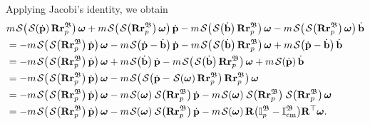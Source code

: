 Applying Jacobi's identity, we obtain
\begin{align}
    &m\SL[\SL[\dot{\mathbf{p}}]\mathbf{R}\mathbf{r}_p^\mathfrak{B}]\boldsymbol{\omega} + m\SL[\SL[\mathbf{R}\mathbf{r}_p^\mathfrak{B}]\boldsymbol{\omega}]\dot{\mathbf{p}}
    -m\SL[\SL[\dot{\mathbf{b}}]\mathbf{R}\mathbf{r}_p^\mathfrak{B}]\boldsymbol{\omega}  -m\SL[\SL[\mathbf{R}\mathbf{r}_p^\mathfrak{B}]\boldsymbol{\omega}]\dot{\mathbf{b}}\nonumber\\
    &=-m\SL[\SL[\mathbf{R}\mathbf{r}_p^\mathfrak{B}]\dot{\mathbf{p}}]\boldsymbol{\omega}
    -m\SL[\dot{\mathbf{p}} - \dot{\mathbf{b}}]\dot{\mathbf{p}}
    -m\SL[\SL[\dot{\mathbf{b}}]\mathbf{R}\mathbf{r}_p^\mathfrak{B}]\boldsymbol{\omega}
    +m\SL[\dot{\mathbf{p}} - \dot{\mathbf{b}}]\dot{\mathbf{b}}\nonumber\\
    &=-m\SL[\SL[\mathbf{R}\mathbf{r}_p^\mathfrak{B}]\dot{\mathbf{p}}]\boldsymbol{\omega}
    +m\SL[\dot{\mathbf{b}}]\dot{\mathbf{p}}
    -m\SL[\SL[\dot{\mathbf{b}}]\mathbf{R}\mathbf{r}_p^\mathfrak{B}]\boldsymbol{\omega}
    +m\SL[\dot{\mathbf{p}}]\dot{\mathbf{b}}\nonumber\\
    &=-m\SL[\SL[\mathbf{R}\mathbf{r}_p^\mathfrak{B}]\dot{\mathbf{p}}]\boldsymbol{\omega}
    -m\SL[\SL[\dot{\mathbf{p}}-\SL[\boldsymbol{\omega}]\mathbf{R}\mathbf{r}_p^\mathfrak{B}]\mathbf{R}\mathbf{r}_p^\mathfrak{B}]\boldsymbol{\omega}\nonumber\\
    &=-m\SL[\SL[\mathbf{R}\mathbf{r}_p^\mathfrak{B}]\dot{\mathbf{p}}]\boldsymbol{\omega}
    -m\SL[\boldsymbol{\omega}]\SL[\mathbf{R}\mathbf{r}_p^\mathfrak{B}]\dot{\mathbf{p}}
    - m\SL[\boldsymbol{\omega}]\SL[\mathbf{R}\mathbf{r}_p^\mathfrak{B}]\SL[\mathbf{R}\mathbf{r}_p^\mathfrak{B}]\boldsymbol{\omega}\nonumber\\
    &=-m\SL[\SL[\mathbf{R}\mathbf{r}_p^\mathfrak{B}]\dot{\mathbf{p}}]\boldsymbol{\omega}
    -m\SL[\boldsymbol{\omega}]\SL[\mathbf{R}\mathbf{r}_p^\mathfrak{B}]\dot{\mathbf{p}}
    - m\SL[\boldsymbol{\omega}]\mathbf{R}\bigl(\mathbb{I}^\mathfrak{B}_p-\mathbb{I}^\mathfrak{B}_\text{cm}\bigr)\mathbf{R}^\top\boldsymbol{\omega}. \label{eq:partial-torque3}
\end{align}
